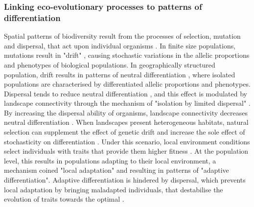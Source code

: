 \subsubsection{Linking eco-evolutionary processes to patterns of differentiation}
Spatial patterns of biodiversity result from the processes of selection, mutation and dispersal, that act upon individual organisms \citep{hamilton2021population}.
% 
In finite size populations, mutations result in "drift" \citep{Slatkin1987a}, causing stochastic variations in the allelic proportions and phenotypes of biological populations. In geographically structured population, drift results in patterns of neutral differentiation \citep{Slatkin1987a}, where isolated populations are characterised by differentiated allelic proportions and phenotypes. 
% 
Dispersal tends to reduce neutral differentiation \citep{Slatkin1987a}, and this effect is modulated by landscape connectivity \citep{Wright1943,McRae2006,McRae2007} through the mechanism of "isolation by limited dispersal" \citep{Orsini2013}. By increasing the dispersal ability of organisms, landscape connectivity decreases neutral differentiation \citep{Lande1991}.
% 
When landscapes present heterogeneous habitats, natural selection can supplement the effect of genetic drift and increase the sole effect of stochasticity on differentiation \citep{fisher1958genetical}. Under this scenario, local environment conditions select individuals with traits that provide them higher fitness \citep{Gaither2018}. At the population level, this results in populations adapting to their local environment, a mechanism coined "local adaptation" \citep{Kawecki2004} and resulting in patterns of "adaptive differentiation". 
% 
% 
Adaptive differentiation is hindered by dispersal, which prevents local adaptation by bringing maladapted individuals, that destabilise the evolution of traits towards the optimal \citep{Meszena1997,Debarre2013,Mirrahimi2020}.
% 
% 
